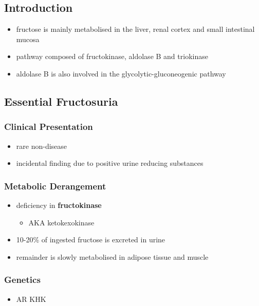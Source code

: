 \documentclass[12pt]{scrartcl}
\begin{document}
\subsection{Introduction}
\label{sec:orgb63e622}
\begin{itemize}
\item fructose is mainly metabolised in the liver, renal cortex and small
intestinal mucosa
\item pathway composed of fructokinase, aldolase B and triokinase
\item aldolase B is also involved in the glycolytic-gluconeogenic pathway
\end{itemize}

\subsection{Essential Fructosuria}
\label{sec:org36011d0}
\subsubsection{Clinical Presentation}
\label{sec:org9b69952}
\begin{itemize}
\item rare non-disease
\item incidental finding due to positive urine reducing substances
\end{itemize}
\subsubsection{Metabolic Derangement}
\label{sec:org234e839}
\begin{itemize}
\item deficiency in \textbf{fructokinase}
\begin{itemize}
\item AKA ketokexokinase
\end{itemize}
\end{itemize}


\begin{itemize}
\item 10-20\% of ingested fructose is excreted in urine
\item remainder is slowly metabolised in adipose tissue and muscle
\end{itemize}
\subsubsection{Genetics}
\label{sec:orgda0d9d7}
\begin{itemize}
\item AR KHK
\end{itemize}
\end{document}
